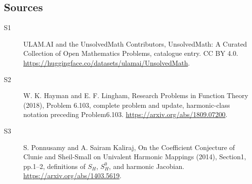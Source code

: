 \documentclass[11pt]{article}
\begin{document}
\subsection{Sources}
\begin{description}
\item[\hypertarget{source:statement:1}{S1}] ULAM.AI and the UnsolvedMath Contributors, UnsolvedMath: A Curated Collection of Open Mathematics Problems, catalogue entry. CC BY 4.0. \url{https://huggingface.co/datasets/ulamai/UnsolvedMath}.
\item[\hypertarget{source:statement:2}{S2}] W. K. Hayman and E. F. Lingham, Research Problems in Function Theory (2018), Problem 6.103, complete problem and update, harmonic-class notation preceding Problem6.103. \url{https://arxiv.org/abs/1809.07200}.
\item[\hypertarget{source:statement:3}{S3}] S. Ponnusamy and A. Sairam Kaliraj, On the Coefficient Conjecture of Clunie and Sheil-Small on Univalent Harmonic Mappings (2014), Section1, pp.1--2, definitions of $S_H$, $S_H^0$, and harmonic Jacobian. \url{https://arxiv.org/abs/1403.5619}.
\end{description}
\label{end:statement}
\end{document}
